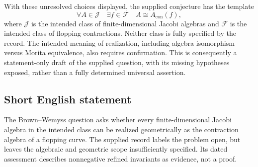 \documentclass[11pt]{article}
\begin{document}
With these unresolved choices displayed, the supplied conjecture has the template
\[
\forall A\in\mathcal J\quad
\exists f\in\mathcal F\quad
A\cong A_{\mathrm{con}}(f),
\]
where \(\mathcal J\) is the intended class of finite-dimensional Jacobi algebras and \(\mathcal F\) is the intended class of flopping contractions. Neither class is fully specified by the record. The intended meaning of realization, including algebra isomorphism versus Morita equivalence, also requires confirmation. This is consequently a statement-only draft of the supplied question, with its missing hypotheses exposed, rather than a fully determined universal assertion.
\subsection{Short English statement}
The Brown--Wemyss question asks whether every finite-dimensional Jacobi algebra in the intended class can be realized geometrically as the contraction algebra of a flopping curve. The supplied record labels the problem open, but leaves the algebraic and geometric scope insufficiently specified. Its dated assessment describes nonnegative refined invariants as evidence, not a proof.
\end{document}
